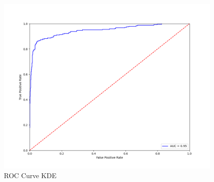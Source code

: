\begin{figure}[p]
    \begin{minipage}[t]{1\textwidth}
       \centering
        
        \includegraphics[width=\textwidth]{images/kde-roc.png}
        \caption{ROC Curve KDE} 
    \end{minipage}
    
\end{figure}

\noindent